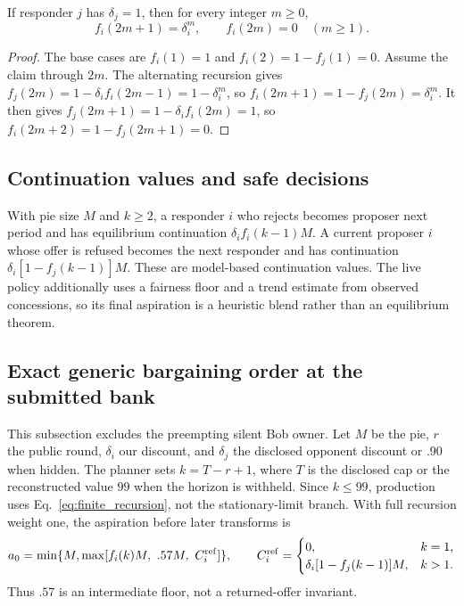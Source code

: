 \begin{proposition}
If responder $j$ has $\delta_j=1$, then for every integer $m\geq0$,
\[
f_i(2m+1)=\delta_i^m,\qquad f_i(2m)=0\quad(m\geq1).
\]
\end{proposition}
\begin{proof}
The base cases are $f_i(1)=1$ and
$f_i(2)=1-f_j(1)=0$. Assume the claim through $2m$. The alternating recursion
gives $f_j(2m)=1-\delta_i f_i(2m-1)=1-\delta_i^m$, so
$f_i(2m+1)=1-f_j(2m)=\delta_i^m$. It then gives
$f_j(2m+1)=1-\delta_i f_i(2m)=1$, so
$f_i(2m+2)=1-f_j(2m+1)=0$.
\end{proof}

\subsection{Continuation values and safe decisions}

With pie size $M$ and $k\geq2$, a responder $i$ who rejects
becomes proposer next period and has equilibrium continuation
$\delta_i f_i(k-1)M$. A current proposer $i$ whose offer is refused becomes
the next responder and has continuation
$\delta_i[1-f_j(k-1)]M$. These are model-based continuation values. The live
policy additionally uses a fairness floor and a trend estimate from observed
concessions, so its final aspiration is a heuristic blend rather than an
equilibrium theorem.

\subsection{Exact generic bargaining order at the submitted bank}

This subsection excludes the preempting silent Bob owner. Let $M$ be the pie,
$r$ the public round, $\delta_i$ our discount, and $\delta_j$ the disclosed
opponent discount or $.90$ when hidden. The planner sets $k=T-r+1$, where $T$
is the disclosed cap or the reconstructed value $99$ when the horizon is
withheld. Since $k\leq99$, production uses Eq.~\eqref{eq:finite_recursion}, not
the stationary-limit branch. With full recursion weight one, the aspiration
before later transforms is
\begin{equation}
a_0=\min\{M,\max[f_i(k)M,\ .57M,\ C_i^{\rm ref}]\},\qquad
C_i^{\rm ref}=\begin{cases}
0,&k=1,\\
\delta_i[1-f_j(k-1)]M,&k>1.
\end{cases}
\label{eq:generic_barg_aspiration}
\end{equation}
Thus $.57$ is an intermediate floor, not a returned-offer invariant.

